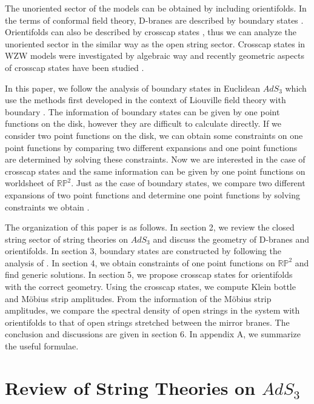 \documentclass[a4paper,12pt]{article}
\newcommand{\brp}{{\mathbb R \mathbb P}^2}
\begin{document}
The unoriented sector of the models can be obtained by including
orientifolds. 
In the terms of conformal field theory, D-branes are described by
boundary states \cite{ishibashi,cardy}.
Orientifolds can also be described by crosscap states
\cite{CLNY,Pol}, thus we can analyze the unoriented sector in the
similar way as the open string sector.  
Crosscap states in WZW models were investigated by algebraic
way \cite{sagnotti1,sagnotti2,sagnotti3} and recently geometric
aspects of crosscap states have been studied
\cite{oplane1,oplane2,oplane3,oplane4,pfoplane}. 

In this paper, we follow the analysis of boundary states in Euclidean 
$AdS_3$ \cite{GKS,PS,LOP,PST} which use the methods 
first developed in the context of Liouville field theory with
boundary \cite{FZZ,TLB,ZZ,Hos,PT,FH,ARS}. 
The information of boundary states can be given by one point
functions on the disk, however they are difficult to calculate directly. 
If we consider two point functions on the disk, we can obtain some
constraints on one point functions by comparing two different
expansions \cite{sewingbs} and one point functions are determined by
solving these constraints.
Now we are interested in the case of crosscap states and the same information
can be given by one point functions on worldsheet of
$\brp$. Just as the case of boundary states, we compare two
different expansions of two point functions and determine one
point functions by solving constraints we obtain \cite{sewingcs}.


The organization of this paper is as follows. 
In section 2, we review the closed string sector of string theories on
$AdS_3$ and discuss the geometry of D-branes and orientifolds.  
In section 3, boundary states are constructed by following the
analysis of \cite{LOP,PST}. 
In section 4, we obtain constraints of one point functions on
$\brp$ and find generic solutions. 
In section 5, we propose crosscap states for orientifolds with
the correct geometry.  Using the crosscap states, 
we compute Klein bottle and M\"{o}bius strip amplitudes.
From the information of the M\"{o}bius strip amplitudes, we
compare the spectral density of open strings in the system with
orientifolds to that of open strings
stretched between the mirror branes.
The conclusion and discussions are given in section 6.
In appendix A, we summarize the useful formulae.


\section{Review of String Theories on $AdS_3$}
\indent
\end{document}
